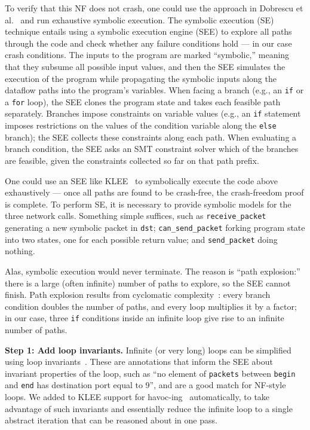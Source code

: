 \documentclass[letterpaper,twocolumn,10pt]{article}
\newcommand{\code}[1]{\lstinline{#1}}
\begin{document}
To verify that this NF does not crash, one could use the approach in Dobrescu et al.~\cite{dobrescu2014software} and run exhaustive symbolic execution. The symbolic execution (SE) technique entails using a symbolic execution engine (SEE) to explore all paths through the code and check whether any failure conditions hold --- in our case crash conditions. The inputs to the program are marked ``symbolic,'' meaning that they subsume all possible input values, and then the SEE simulates the execution of the program while propagating the symbolic inputs along the dataflow paths into the program's variables. When facing a branch (e.g., an \code{if} or a \code{for} loop), the SEE clones the program state and takes each feasible path separately. Branches impose constraints on variable values (e.g., an \code{if} statement imposes restrictions on the values of the condition variable along the \code{else} branch); the SEE collects these constraints along each path. When evaluating a branch condition, the SEE asks an SMT constraint solver which of the branches are feasible, given the constraints collected so far on that path prefix.

One could use an SEE like KLEE~\cite{cadar2008klee} to symbolically execute the code above exhaustively --- once all paths are found to be crash-free, the crash-freedom proof is complete. To perform SE, it is necessary to provide symbolic models for the three network calls. Something simple suffices, such as \code{receive_packet} generating a new symbolic packet in \code{dst}; \code{can_send_packet} forking program state into two states, one for each possible return value; and \code{send_packet} doing nothing. 

Alas, symbolic execution would never terminate. The reason is ``path explosion:'' there is a large (often infinite) number of paths to explore, so the SEE cannot finish.  Path explosion results from cyclomatic complexity~\cite{mccabe:cyclomatic}: every branch condition doubles the number of paths, and every loop multiplies it by a factor; in our case, three \code{if} conditions inside an infinite loop give rise to an infinite number of paths. 

{\bf Step 1: Add loop invariants.} Infinite (or very long) loops can be simplified using loop invariants~\cite[\S~2.1]{cormen2009introduction}. These are annotations that inform the SEE about invariant properties of the loop, such as ``no element of \code{packets} between \code{begin} and \code{end} has destination port equal to 9'', and are a good match for NF-style loops.  We added to KLEE support for havoc-ing~\cite{boogie} automatically, to take advantage of such invariants and essentially reduce the infinite loop to a single abstract iteration that can be reasoned about in one pass.
 
\end{document}
